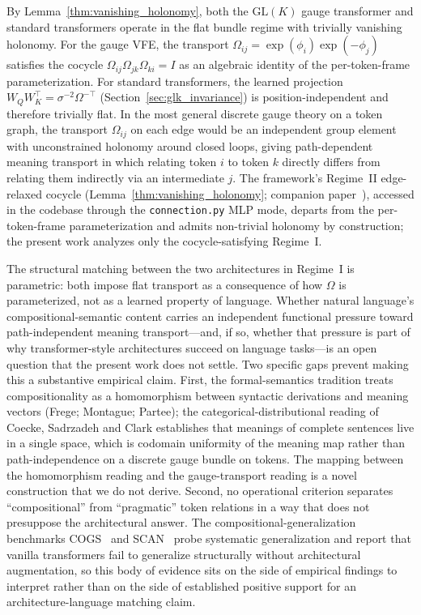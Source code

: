 \documentclass[twoside,11pt]{article}
\begin{document}
By Lemma~\ref{thm:vanishing_holonomy}, both the $\mathrm{GL}(K)$ gauge transformer and standard transformers operate in the flat bundle regime with trivially vanishing holonomy. For the gauge VFE, the transport $\Omega_{ij} = \exp(\phi_i)\exp(-\phi_j)$ satisfies the cocycle $\Omega_{ij}\Omega_{jk}\Omega_{ki} = I$ as an algebraic identity of the per-token-frame parameterization. For standard transformers, the learned projection $W_Q W_K^\top = \sigma^{-2}\Omega^{-\top}$ (Section~\ref{sec:glk_invariance}) is position-independent and therefore trivially flat. In the most general discrete gauge theory on a token graph, the transport $\Omega_{ij}$ on each edge would be an independent group element with unconstrained holonomy around closed loops, giving path-dependent meaning transport in which relating token $i$ to token $k$ directly differs from relating them indirectly via an intermediate $j$. The framework's Regime~II edge-relaxed cocycle (Lemma~\ref{thm:vanishing_holonomy}; companion paper~\citep{Dennis2025it}), accessed in the codebase through the \texttt{connection.py} MLP mode, departs from the per-token-frame parameterization and admits non-trivial holonomy by construction; the present work analyzes only the cocycle-satisfying Regime~I.

The structural matching between the two architectures in Regime~I is parametric: both impose flat transport as a consequence of how $\Omega$ is parameterized, not as a learned property of language. Whether natural language's compositional-semantic content carries an independent functional pressure toward path-independent meaning transport---and, if so, whether that pressure is part of why transformer-style architectures succeed on language tasks---is an open question that the present work does not settle. Two specific gaps prevent making this a substantive empirical claim. First, the formal-semantics tradition treats compositionality as a homomorphism between syntactic derivations and meaning vectors (Frege; Montague; Partee); the categorical-distributional reading of Coecke, Sadrzadeh and Clark establishes that meanings of complete sentences live in a single space, which is codomain uniformity of the meaning map rather than path-independence on a discrete gauge bundle on tokens. The mapping between the homomorphism reading and the gauge-transport reading is a novel construction that we do not derive. Second, no operational criterion separates ``compositional'' from ``pragmatic'' token relations in a way that does not presuppose the architectural answer. The compositional-generalization benchmarks COGS~\citep{kim2020cogs} and SCAN~\citep{lake2018generalization} probe systematic generalization and report that vanilla transformers fail to generalize structurally without architectural augmentation, so this body of evidence sits on the side of empirical findings to interpret rather than on the side of established positive support for an architecture-language matching claim.
\end{document}
